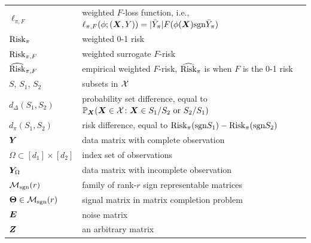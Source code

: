 \documentclass[11pt]{article}
\theoremstyle{plain}
\theoremstyle{definition}
\def\caliM{\tM_{\textup{sgn}}}
\def\sign{\textup{sgn}}
\def\risk{\textup{Risk}_\pi}
\def\erisk{\widehat{\textup{Risk}}_\pi}
\def\caliM{\tM_{\textup{sgn}}}
\def\riskF{\textup{Risk}_{\pi,F}}
\def\eriskF{\widehat{\textup{Risk}}_{\pi,F}}
\begin{document}
\begin{table}[ht]
\begin{tabular}{l|l}
$\ell_{\pi,F}$ & weighted $F$-loss function, i.e., $\ell_{\pi,F}(\phi;(\mX,Y)) = |\bar{Y}_\pi|F(\phi(\mX)\sign\bar{Y}_\pi)$\\
$\risk$ & weighted 0-1 risk \\
$\riskF$ & weighted surrogate $F$-risk\\
$\eriskF$ & empirical weighted  $F$-risk,  $\erisk$ is when $F$ is the 0-1 risk\\
$S$, $S_1$, $S_2$ & subsets in $\mathcal{X}$\\
$d_{\Delta}(S_1,S_2)$&probability set difference, equal to $\mathbb{P}_{\bm X}(\bm X\in\mathcal{X}\colon \bm X\in S_1/S_2 \text{ or }S_2/S_1)$\\
$d_{\pi}(S_1,S_2)$& risk difference, equal to $\risk(\sign S_1)-\risk(\sign S_2)$\\
$\bm Y$ & data matrix with complete observation\\
$\Omega\subset[d_1]\times[d_2]$ & index set of observations\\
$\bm Y_{\Omega}$ & data matrix with incomplete observation\\
$\caliM(r)$ & family of rank-$r$ sign representable matrices\\
$\mTheta\in\caliM(r)$ & signal matrix in matrix completion problem\\
$\bm{E}$ & noise matrix\\
$\bm Z$ & an arbitrary matrix\\
\end{tabular}
\end{table}
\clearpage
\end{document}
